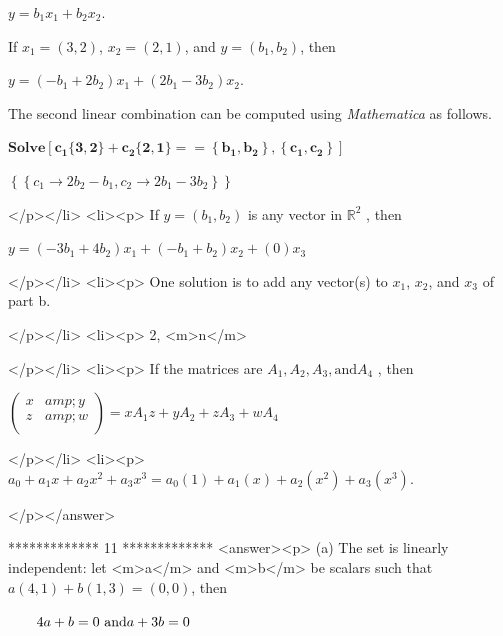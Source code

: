 \(y = b_1x_1+b_2x_2\). 



         If  \(x_1 = (3, 2)\), \(x_2= (2,1)\), and \(y = \left(b_1, b_2\right)\), then



\(y =\left(- b_1+2b_2\right)x_1+\left(2b_1-3b_2\right)x_2\).



       The second linear combination can be computed using \textit{ Mathematica} as follows.

\begin{doublespace}
\noindent\(\pmb{\text{Solve}\left[c_1\{3,2\}+c_2\{2,1\}==\left\{b_1,b_2\right\},\left\{c_1,c_2\right\}\right]}\)
\end{doublespace}

\begin{doublespace}
\noindent\(\left\{\left\{c_1\to 2 b_2-b_1,c_2\to 2 b_1-3 b_2\right\}\right\}\)
\end{doublespace}

</p></li>
<li><p> If \(y = \left(b_1, b_2\right)\) is any vector in \(\mathbb{R}^2\) , then



 \(y =\left(- 3b_1+4b_2\right)x_1+\left(-b_1+b_2\right)x_2 + (0)x_3\)

</p></li>
<li><p> One solution is to add any vector(s) to \(x_1\), \(x_2\), and \(x_3\) of part b.

</p></li>
<li><p> 2, <m>n</m>

</p></li>
<li><p> If the matrices are \(A_1,A_2 ,A_3,\text{and} A_4\) , then



\(\left(
\begin{array}{cc}
 x &amp; y \\
 z &amp; w \\
\end{array}
\right)= x A_1z+y A_2+ z A_3+ w A_4\)

</p></li>
<li><p> \(a_0+a_1x + a_2x^2+ a_3x^3=a_0(1)+a_1(x) + a_2\left(x^2\right)+ a_3\left(x^3\right)\).

</p></answer>


*************
11
*************
<answer><p> (a) The set is linearly independent: let <m>a</m> and <m>b</m> be scalars such that \(a(4, 1) + b(1, 3) = (0, 0)\), then 



$\quad \quad $\(4a + b = 0\text{     }\text{and} \\
\\
 a + 3b= 0\)



